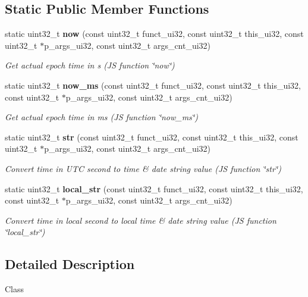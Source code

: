 \subsection*{Static Public Member Functions}
\begin{DoxyCompactItemize}
\item 
static uint32\+\_\+t \textbf{ now} (const uint32\+\_\+t funct\+\_\+ui32, const uint32\+\_\+t this\+\_\+ui32, const uint32\+\_\+t $\ast$p\+\_\+args\+\_\+ui32, const uint32\+\_\+t args\+\_\+cnt\+\_\+ui32)
\begin{DoxyCompactList}\small\item\em Get actual epoch time in s (JS function \char`\"{}now\char`\"{}) \end{DoxyCompactList}\item 
static uint32\+\_\+t \textbf{ now\+\_\+ms} (const uint32\+\_\+t funct\+\_\+ui32, const uint32\+\_\+t this\+\_\+ui32, const uint32\+\_\+t $\ast$p\+\_\+args\+\_\+ui32, const uint32\+\_\+t args\+\_\+cnt\+\_\+ui32)
\begin{DoxyCompactList}\small\item\em Get actual epoch time in ms (JS function \char`\"{}now\+\_\+ms\char`\"{}) \end{DoxyCompactList}\item 
static uint32\+\_\+t \textbf{ str} (const uint32\+\_\+t funct\+\_\+ui32, const uint32\+\_\+t this\+\_\+ui32, const uint32\+\_\+t $\ast$p\+\_\+args\+\_\+ui32, const uint32\+\_\+t args\+\_\+cnt\+\_\+ui32)
\begin{DoxyCompactList}\small\item\em Convert time in U\+TC second to time \& date string value (JS function \char`\"{}str\char`\"{}) \end{DoxyCompactList}\item 
static uint32\+\_\+t \textbf{ local\+\_\+str} (const uint32\+\_\+t funct\+\_\+ui32, const uint32\+\_\+t this\+\_\+ui32, const uint32\+\_\+t $\ast$p\+\_\+args\+\_\+ui32, const uint32\+\_\+t args\+\_\+cnt\+\_\+ui32)
\begin{DoxyCompactList}\small\item\em Convert time in local second to local time \& date string value (JS function \char`\"{}local\+\_\+str\char`\"{}) \end{DoxyCompactList}\end{DoxyCompactItemize}


\subsection{Detailed Description}
Class 

